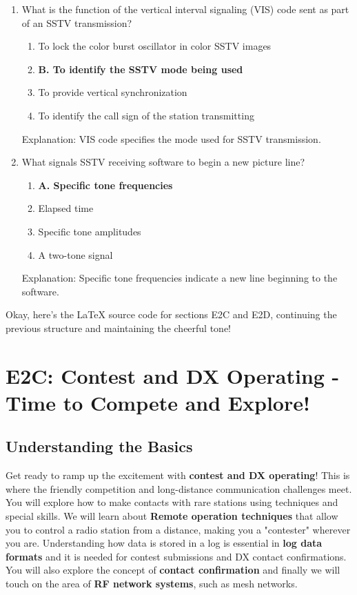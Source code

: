 \begin{enumerate}
         \item What is the function of the vertical interval signaling (VIS) code sent as part of an SSTV transmission?
       \begin{enumerate}
          \item  To lock the color burst oscillator in color SSTV images
        \item \textbf{B. To identify the SSTV mode being used}
       \item  To provide vertical synchronization
        \item  To identify the call sign of the station transmitting
        \end{enumerate}
       \textcolor{myred}{Explanation:}
        VIS code specifies the mode used for SSTV transmission.

    \item What signals SSTV receiving software to begin a new picture line?
    \begin{enumerate}
      \item \textbf{A. Specific tone frequencies}
       \item  Elapsed time
     \item  Specific tone amplitudes
       \item  A two-tone signal
    \end{enumerate}
    \textcolor{myred}{Explanation:}
       Specific tone frequencies indicate a new line beginning to the software.
\end{enumerate}



Okay, here's the LaTeX source code for sections E2C and E2D, continuing the previous structure and maintaining the cheerful tone!

\section{E2C: Contest and DX Operating - Time to Compete and Explore!}

\subsection*{Understanding the Basics}
Get ready to ramp up the excitement with \textcolor{myblue}{\textbf{contest and DX operating}}! This is where the friendly competition and long-distance communication challenges meet. You will explore how to make contacts with rare stations using techniques and special skills.
We will learn about \textcolor{myblue}{\textbf{Remote operation techniques}} that allow you to control a radio station from a distance, making you a "contester" wherever you are.
Understanding how data is stored in a log is essential in \textcolor{myblue}{\textbf{log data formats}} and it is needed for contest submissions and DX contact confirmations. You will also explore the concept of \textcolor{myblue}{\textbf{contact confirmation}} and finally we will touch on the area of \textcolor{myblue}{\textbf{RF network systems}}, such as mesh networks.

